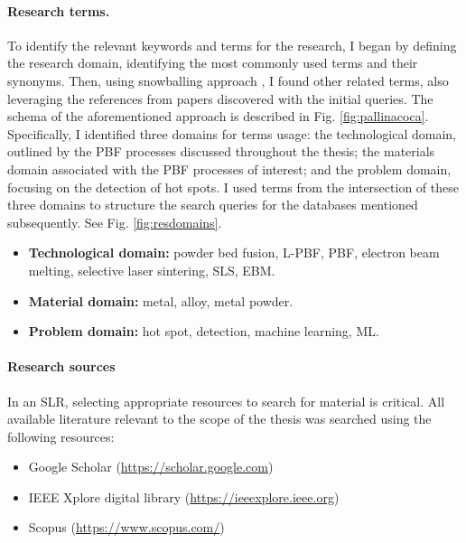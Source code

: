 \paragraph{Research terms.}
To identify the relevant keywords and terms for the research, I began by defining the research domain, identifying the most commonly used terms and their synonyms. Then, using snowballing approach \cite{wohlin_guidelines_2014}, I found other related terms, also leveraging the references from papers discovered with the initial queries. The schema of the aforementioned approach is described in Fig. \ref{fig:pallinacoca}. Specifically, I identified three domains for terms usage: the technological domain, outlined by the PBF processes discussed throughout the thesis; the materials domain associated with the PBF processes of interest; and the problem domain, focusing on the detection of hot spots. I used terms from the intersection of these three domains to structure the search queries for the databases mentioned subsequently. See Fig. \ref{fig:resdomains}.
\begin{itemize}
    \item \textbf{Technological domain:} powder bed fusion, L-PBF, PBF, electron beam melting, selective laser sintering, SLS, EBM.
    \item \textbf{Material domain:} metal, alloy, metal powder.
    \item \textbf{Problem domain:} hot spot, detection, machine learning, ML.
\end{itemize}

\paragraph{Research sources} In an SLR, selecting appropriate resources to search for material is critical. All available literature relevant to the scope of the thesis was searched using the following resources:
\begin{itemize}
    \item Google Scholar (\href{https://scholar.google.com}{https://scholar.google.com})
    \item IEEE Xplore digital library (\href{https://ieeexplore.ieee.org}{https://ieeexplore.ieee.org})
    \item Scopus (\href{https://www.scopus.com/}{https://www.scopus.com/})
\end{itemize}

